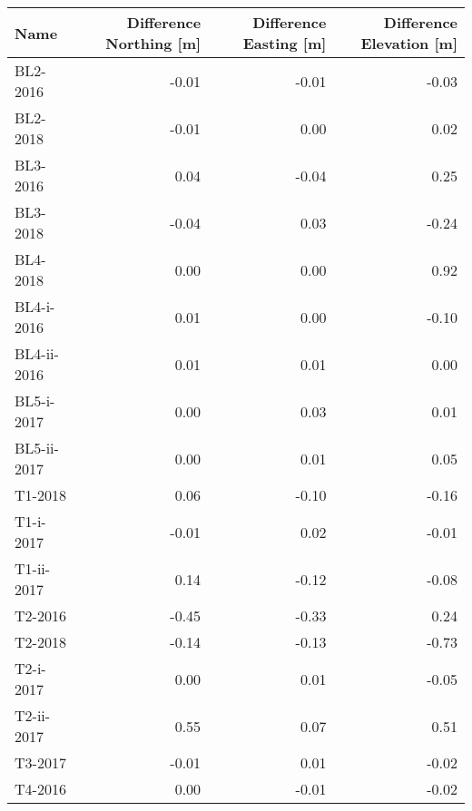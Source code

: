\begin{tabular}{lrrr}
\toprule
        Name &  Difference Northing [m] &  Difference Easting [m] &  Difference Elevation [m] \\
\midrule
    BL2-2016 &                    -0.01 &                   -0.01 &                     -0.03 \\
    BL2-2018 &                    -0.01 &                    0.00 &                      0.02 \\
    BL3-2016 &                     0.04 &                   -0.04 &                      0.25 \\
    BL3-2018 &                    -0.04 &                    0.03 &                     -0.24 \\
    BL4-2018 &                     0.00 &                    0.00 &                      0.92 \\
  BL4-i-2016 &                     0.01 &                    0.00 &                     -0.10 \\
 BL4-ii-2016 &                     0.01 &                    0.01 &                      0.00 \\
  BL5-i-2017 &                     0.00 &                    0.03 &                      0.01 \\
 BL5-ii-2017 &                     0.00 &                    0.01 &                      0.05 \\
     T1-2018 &                     0.06 &                   -0.10 &                     -0.16 \\
   T1-i-2017 &                    -0.01 &                    0.02 &                     -0.01 \\
  T1-ii-2017 &                     0.14 &                   -0.12 &                     -0.08 \\
     T2-2016 &                    -0.45 &                   -0.33 &                      0.24 \\
     T2-2018 &                    -0.14 &                   -0.13 &                     -0.73 \\
   T2-i-2017 &                     0.00 &                    0.01 &                     -0.05 \\
  T2-ii-2017 &                     0.55 &                    0.07 &                      0.51 \\
     T3-2017 &                    -0.01 &                    0.01 &                     -0.02 \\
     T4-2016 &                     0.00 &                   -0.01 &                     -0.02 \\

\end{tabular}
